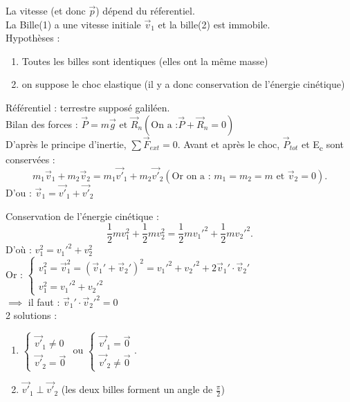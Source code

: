 \documentclass{article}
\begin{document}

La vitesse (et donc $\vec{p}$) dépend du réferentiel.\\
La Bille(1) a une vitesse initiale $\vec{v}_1$ et la bille(2) est immobile. \\
Hypothèses : 
\begin{enumerate}
    \item Toutes les billes sont identiques (elles ont la même masse)
    \item on suppose le choc elastique (il y a donc conservation de l'énergie cinétique)
\end{enumerate}
Référentiel : terrestre supposé galiléen.\\
Bilan des forces : $\vec{P} = m\vec{g} \text{ et } \vec{R}_n (\text{On a :} \vec{P}+\vec{R}_n = 0)$\\
D'après le principe d'inertie, $\sum \vec{F}_{ext} = 0$. Avant et après le choc, $\vec{P}_{tot}$ et E\textsubscript{c} sont conservées : 
\[
m_1\vec{v}_1 + m_2 \vec{v}_2 = m_1 \vec{v'}_1 + m_2 \vec{v'}_2 (\text{Or on a : } m_1 = m_2 = m \text{ et } \vec{v}_2 =0) 
.\] 
D'ou : $\vec{v}_1 = \vec{v'}_1 +\vec{v'}_2$

Conservation de l'énergie cinétique : 
\[
\frac{1}{2}mv_1^2 + \frac{1}{2} mv_2^2 = \frac{1}{2}mv_1'^2 + \frac{1}{2}mv_2'^2
.\] 
D'où : \(v_1^2 = v_1'^2 + v_2^2 \)\\
Or : \(\begin{cases}
    v_1^2 = \vec{v}_1^2 = (\vec{v}_1' + \vec{v}_2')^2 = v_1'^2 + v_2'^2 + 2\vec{v}_1' \cdot \vec{v}_2'\\
    v_1^2 = v_1'^2 + v_2'^2
\end{cases} \)\\
\(\implies  \) il faut : \(\vec{v}_1' \cdot \vec{v}_2'^2 = 0\)\\

2 solutions : \\ 
\begin{enumerate}
    \item \(
    \begin{cases}
        \vec{v'}_1 \neq 0 \\ \vec{v'}_2 = \vec{0}
    \end{cases} \text{ ou } \begin{cases}
        \vec{v'}_1 = \vec{0}\\ \vec{v'}_2 \neq \vec{0}
    \end{cases}
    .\)
    \item \(\vec{v'}_1 \perp \vec{v'}_2\) (les deux billes forment un angle de $\frac{\pi}{2}$)
\end{enumerate}
\end{document}
